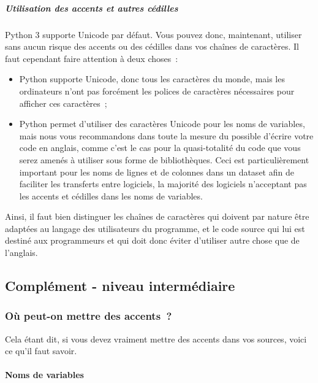     \hypertarget{utilisation-des-accents-et-autres-cuxe9dilles}{%
\subparagraph{Utilisation des accents et autres
cédilles}\label{utilisation-des-accents-et-autres-cuxe9dilles}}

    Python 3 supporte Unicode par défaut. Vous pouvez donc, maintenant,
utiliser sans aucun risque des accents ou des cédilles dans vos chaînes
de caractères. Il faut cependant faire attention à deux choses~:

\begin{itemize}
\tightlist
\item
  Python supporte Unicode, donc tous les caractères du monde, mais les
  ordinateurs n'ont pas forcément les polices de caractères nécessaires
  pour afficher ces caractères~;
\item
  Python permet d'utiliser des caractères Unicode pour les noms de
  variables, mais nous vous recommandons dans toute la mesure du
  possible d'écrire votre code en anglais, comme c'est le cas pour la
  quasi-totalité du code que vous serez amenés à utiliser sous forme de
  bibliothèques. Ceci est particulièrement important pour les noms de
  lignes et de colonnes dans un dataset afin de faciliter les transferts
  entre logiciels, la majorité des logiciels n'acceptant pas les accents
  et cédilles dans les noms de variables.
\end{itemize}

Ainsi, il faut bien distinguer les chaînes de caractères qui doivent par
nature être adaptées au langage des utilisateurs du programme, et le
code source qui lui est destiné aux programmeurs et qui doit donc éviter
d'utiliser autre chose que de l'anglais.

    \hypertarget{compluxe9ment---niveau-intermuxe9diaire}{%
\subsection{Complément - niveau
intermédiaire}\label{compluxe9ment---niveau-intermuxe9diaire}}

    \hypertarget{ouxf9-peut-on-mettre-des-accents}{%
\subsubsection{Où peut-on mettre des
accents~?}\label{ouxf9-peut-on-mettre-des-accents}}

    Cela étant dit, si vous devez vraiment mettre des accents dans vos
sources, voici ce qu'il faut savoir.

    \hypertarget{noms-de-variables}{%
\paragraph{Noms de variables}\label{noms-de-variables}}


